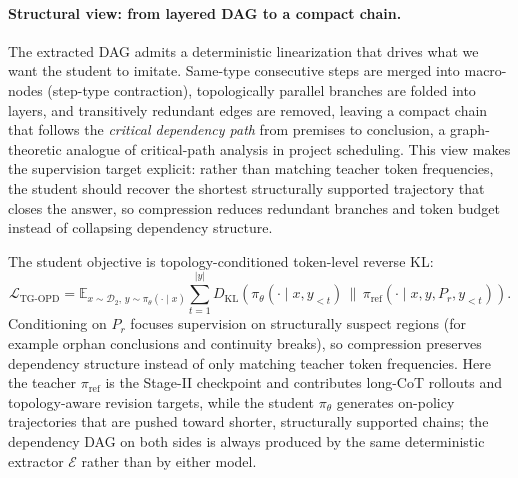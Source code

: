 \paragraph{Structural view: from layered DAG to a compact chain.}
The extracted DAG admits a deterministic linearization that drives what we want the student to imitate.
Same-type consecutive steps are merged into macro-nodes (step-type contraction), topologically parallel branches are folded into layers, and transitively redundant edges are removed, leaving a compact chain that follows the \emph{critical dependency path} from premises to conclusion, a graph-theoretic analogue of critical-path analysis in project scheduling.
This view makes the supervision target explicit: rather than matching teacher token frequencies, the student should recover the shortest structurally supported trajectory that closes the answer, so compression reduces redundant branches and token budget instead of collapsing dependency structure.

The student objective is topology-conditioned token-level reverse KL:
\begin{equation}
\label{eq:tgsd}
\mathcal{L}_{\text{TG-OPD}} =
\mathbb{E}_{x\sim\mathcal{D}_2,\,y\sim\pi_\theta(\cdot\mid x)}
\sum_{t=1}^{|y|}
D_{\mathrm{KL}}\!\left(
\pi_\theta(\cdot\mid x,y_{<t})\,\bigg\|\,
\pi_{\mathrm{ref}}(\cdot\mid x,y,P_r,y_{<t})
\right).
\end{equation}
Conditioning on $P_r$ focuses supervision on structurally suspect regions (for example orphan conclusions and continuity breaks), so compression preserves dependency structure instead of only matching teacher token frequencies.
Here the teacher $\pi_{\mathrm{ref}}$ is the Stage-II \method checkpoint and contributes long-CoT rollouts and topology-aware revision targets, while the student $\pi_\theta$ generates on-policy trajectories that are pushed toward shorter, structurally supported chains; the dependency DAG on both sides is always produced by the same deterministic extractor $\mathcal{E}$ rather than by either model.

